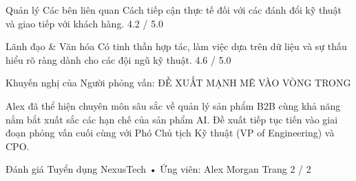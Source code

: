 Quản lý Các bên liên quan
Cách tiếp cận thực tế đối với các đánh đổi kỹ thuật và giao tiếp với khách hàng.
4.2 / 5.0

Lãnh đạo \& Văn hóa
Có tinh thần hợp tác, làm việc dựa trên dữ liệu và sự thấu hiểu rõ ràng dành cho các đội ngũ kỹ thuật.
4.6 / 5.0

Khuyến nghị của Người phỏng vấn: ĐỀ XUẤT MẠNH MẼ VÀO VÒNG TRONG

Alex đã thể hiện chuyên môn sâu sắc về quản lý sản phẩm B2B cùng khả năng nắm bắt xuất sắc các hạn chế của sản phẩm AI. Đề xuất tiếp tục tiến vào giai đoạn phỏng vấn cuối cùng với Phó Chủ tịch Kỹ thuật (VP of Engineering) và CPO.

Đánh giá Tuyển dụng NexusTech • Ứng viên: Alex Morgan
Trang 2 / 2
